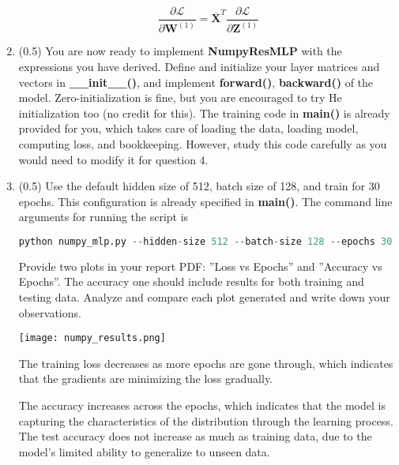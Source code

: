 \documentclass{article}
\begin{document}
\begin{enumerate}
\[
\frac{\partial \mathcal{L}}{\partial \mathbf{W}^{(1)}} = \mathbf{\overline{X}}^T \frac{\partial \mathcal{L}}{\partial \mathbf{Z}^{(1)}}
\]
    
    \item (0.5) You are now ready to implement \textbf{NumpyResMLP} with the expressions you have derived. Define and initialize your layer matrices and vectors in \textbf{\_\_init\_\_()}, and implement \textbf{forward()}, \textbf{backward()} of the model. Zero-initialization is fine, but you are encouraged to try He initialization too (no credit for this). The training code in \textbf{main()} is already provided for you, which takes care of loading the data, loading model, computing loss, and bookkeeping. However, study this code carefully as you would need to modify it for question 4. \\
    
    
    \item (0.5) Use the default hidden size of 512, batch size of 128, and train for 30 epochs. This configuration is already specified in \textbf{main()}. The command line arguments for running the script is 
    \begin{lstlisting}[language = Python]
    python numpy_mlp.py --hidden-size 512 --batch-size 128 --epochs 30
    \end{lstlisting}

    Provide two plots in your report PDF: ''Loss vs Epochs'' and ''Accuracy vs
    Epochs''. The accuracy one should include results for both training and
    testing data. Analyze and compare each plot generated and write down your
    observations.

    \texttt{[image: numpy\_results.png]}

    The training loss decreases as more epochs are gone through, which indicates
    that the gradients are minimizing the loss gradually.

    The accuracy increases across the epochs, which indicates that the model is
    capturing the characteristics of the distribution through the learning
    process.  The test accuracy does not increase as much as training data, due
    to the model's limited ability to generalize to unseen data.


\end{enumerate}
\end{document}
